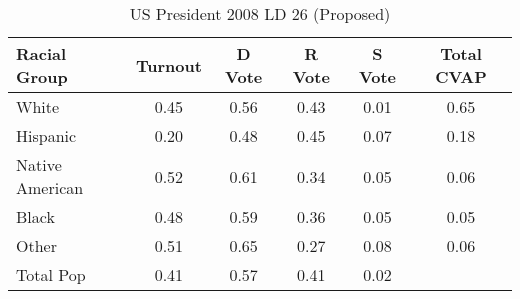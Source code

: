\begin{table}[htb]
\begin{center}
\caption{US President 2008 LD 26 (Proposed)}
\label{pres08_cvap_ld_26}
\begin{tabular}{lccccc}
  \hline
Racial Group & Turnout & D Vote & R Vote & S Vote & Total CVAP \\ 
  \hline
White & 0.45 & 0.56 & 0.43 & 0.01 & 0.65 \\ 
  Hispanic & 0.20 & 0.48 & 0.45 & 0.07 & 0.18 \\ 
  Native American & 0.52 & 0.61 & 0.34 & 0.05 & 0.06 \\ 
  Black & 0.48 & 0.59 & 0.36 & 0.05 & 0.05 \\ 
  Other & 0.51 & 0.65 & 0.27 & 0.08 & 0.06 \\ 
  Total Pop & 0.41 & 0.57 & 0.41 & 0.02 &  \\ 
   \hline
\end{tabular}
\end{center}
\end{table}
